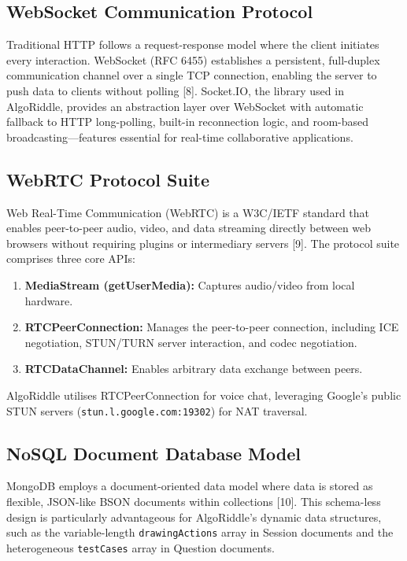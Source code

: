 \documentclass[12pt,a4paper,oneside]{report}
\begin{document}
\subsection{WebSocket Communication Protocol}

Traditional HTTP follows a request-response model where the client initiates every interaction. WebSocket (RFC 6455) establishes a persistent, full-duplex communication channel over a single TCP connection, enabling the server to push data to clients without polling [8]. Socket.IO, the library used in AlgoRiddle, provides an abstraction layer over WebSocket with automatic fallback to HTTP long-polling, built-in reconnection logic, and room-based broadcasting---features essential for real-time collaborative applications.

\subsection{WebRTC Protocol Suite}

Web Real-Time Communication (WebRTC) is a W3C/IETF standard that enables peer-to-peer audio, video, and data streaming directly between web browsers without requiring plugins or intermediary servers [9]. The protocol suite comprises three core APIs:

\begin{enumerate}[label=\arabic*.]
    \item \textbf{MediaStream (getUserMedia):} Captures audio/video from local hardware.
    \item \textbf{RTCPeerConnection:} Manages the peer-to-peer connection, including ICE negotiation, STUN/TURN server interaction, and codec negotiation.
    \item \textbf{RTCDataChannel:} Enables arbitrary data exchange between peers.
\end{enumerate}

AlgoRiddle utilises RTCPeerConnection for voice chat, leveraging Google's public STUN servers (\texttt{stun.l.google.com:19302}) for NAT traversal.

\subsection{NoSQL Document Database Model}

MongoDB employs a document-oriented data model where data is stored as flexible, JSON-like BSON documents within collections [10]. This schema-less design is particularly advantageous for AlgoRiddle's dynamic data structures, such as the variable-length \texttt{drawingActions} array in Session documents and the heterogeneous \texttt{testCases} array in Question documents.
\end{document}
